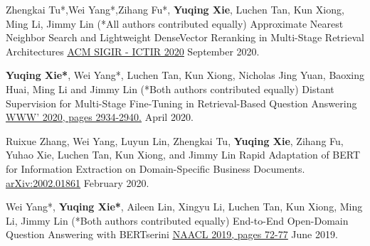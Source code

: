 

\begin{cventries}

\cventry
    {Zhengkai Tu*,Wei Yang*,Zihang Fu*, \textbf{Yuqing Xie}, Luchen Tan, Kun Xiong, Ming Li, Jimmy Lin (*All authors contributed equally)}
    {Approximate Nearest Neighbor Search and Lightweight DenseVector Reranking in Multi-Stage Retrieval Architectures} %
    {{\href{https://cs.uwaterloo.ca/~jimmylin/publications/Tu_etal_ICTIR2020.pdf}{\underline{ ACM SIGIR - ICTIR 2020}}}} %
    {September 2020.} %
    {
    }

\cventry
    {\textbf{Yuqing Xie*}, Wei Yang*, Luchen Tan, Kun Xiong, Nicholas Jing Yuan, Baoxing Huai, Ming Li and Jimmy Lin (*Both authors contributed equally)}
    {Distant Supervision for Multi-Stage Fine-Tuning in Retrieval-Based Question Answering} %
    {{\href{https://dl.acm.org/doi/10.1145/3366423.3380060}{\underline{WWW' 2020, pages 2934-2940.}}}} %
    {April 2020.} %
    {
    }
    
\cventry
    {Ruixue Zhang, Wei Yang, Luyun Lin, Zhengkai Tu, \textbf{Yuqing Xie}, Zihang Fu, Yuhao Xie, Luchen Tan, Kun Xiong, and Jimmy Lin}
    {Rapid Adaptation of BERT for Information Extraction on Domain-Specific Business Documents.} %
    {{\href{https://arxiv.org/abs/2002.01861}{\underline{arXiv:2002.01861}}}} %
    {February 2020.} %
    {
    }

\cventry
    {Wei Yang*, \textbf{Yuqing Xie*}, Aileen Lin, Xingyu Li, Luchen Tan, Kun Xiong, Ming Li, Jimmy Lin (*Both authors contributed equally)}
    {End-to-End Open-Domain Question Answering with BERTserini} %
    {{\href{https://www.aclweb.org/anthology/N19-4013/}{\underline{NAACL 2019, pages 72-77}}}} %
    {June 2019.} %
    {
    }

\end{cventries}
